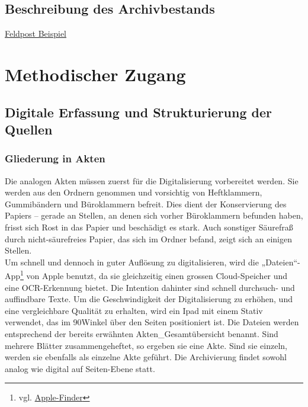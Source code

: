 \documentclass[12pt, a4paper, ngerman, bidi=default]{article}
\begin{document}
\subsection{Beschreibung des Archivbestands}
\newpage

\href{https://free.iiifhosting.com/iiif/959173f8d808ab12ad7847917f79e0e4bc974ebce0040a07afd4b8be3f10c234/}{Feldpost Beispiel}

    
    
    \section{Methodischer Zugang}
    
    \subsection{Digitale Erfassung und Strukturierung der Quellen}
    \subsubsection{Gliederung in Akten}

    Die analogen Akten müssen zuerst für die Digitalisierung vorbereitet werden. Sie werden aus den Ordnern genommen und vorsichtig von Heftklammern, 
    Gummibändern und Büroklammern befreit. Dies dient der Konservierung des Papiers – gerade an Stellen, an denen sich vorher Büroklammern befunden haben, 
    frisst sich Rost in das Papier und beschädigt es stark. Auch sonstiger Säurefraß durch nicht-säurefreies Papier, das sich im Ordner befand, zeigt sich an einigen Stellen.\\

    Um schnell und dennoch in guter Auflösung zu digitalisieren, wird die „Dateien“-App\footnote{vgl. \href{https://support.apple.com/de-de/guide/preview/prvw28034/mac}{Apple-Finder}} von 
    Apple benutzt, da sie gleichzeitig einen grossen Cloud-Speicher und eine OCR-Erkennung bietet. Die Intention dahinter sind schnell durchsuch- und auffindbare Texte.
    Um die Geschwindigkeit der Digitalisierung zu erhöhen, und eine vergleichbare Qualität zu erhalten, wird ein Ipad mit einem Stativ verwendet, das im 90\textdegree Winkel über den Seiten positioniert ist. 
    Die Dateien werden entsprechend der bereits erwähnten Akten\_Gesamtübersicht benannt. Sind mehrere Blätter zusammengeheftet, so ergeben sie eine Akte. Sind sie einzeln, werden sie ebenfalls als einzelne Akte geführt. Die Archivierung findet sowohl analog wie digital auf Seiten-Ebene statt.\\
  
\end{document}
